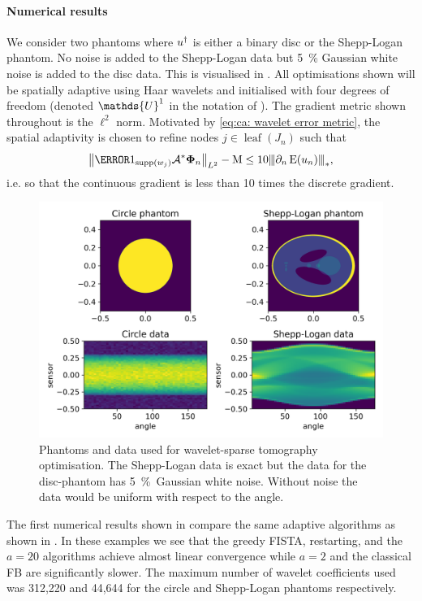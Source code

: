 \documentclass[10pt,a4paper,onecolumn]{article} \usepackage[latin1]{inputenc}
\numberwithin{equation}{section}
\let\F\mathds\let\C\mathcal\newcommand{\R}{\F{R}}\newcommand{\A}{\C{A}}
\newcommand{\Norm}[1]{{\left\vert\kern-0.25ex\left\vert\kern-0.25ex\left\vert #1 \right\vert\kern-0.25ex\right\vert\kern-0.25ex\right\vert}}
\newcommand{\norm}[1]{{\left\lVert #1 \right\rVert}}
\newcommand{\op}[1]{\operatorname{#1}}\newcommand{\overtext}[2]{\stackrel{\text{#1}}{#2}}
\renewcommand{\vec}{\mathbf}
\newcommand*{\Func}[1]{%
	\IfEqCase{#1}{%
		{0}{\op{E}}%
		{1}{\op{F}}%
		{2}{\op{G}}%
		{3}{\op{H}}%
	}[\op{F}#1]%
}
\newcommand*{\varf}[1]{%
	\IfEqCase{#1}{%
		{0}{u}%
		{1}{v}%
		{2}{w}%
	}[u#1]%
}
\newcommand*{\spcf}[1]{%
	\IfEqCase{#1}{%
		{0}{\F{U}}%
		{1}{\F{V}}%
		{2}{\F{W}}%
	}[\F{U}#1]%
}
\newcommand*{\vard}[1]{%
	\IfEqCase{#1}{%
		{0}{\varphi}%
		{1}{\psi}%
	}[\varphi #1]%
}
\newcommand*{\data}[1]{%
	\IfEqCase{#1}{%
		{0}{\eta}%
		{1}{\nu}%
	}[g]%
}
\newcommand*{\vvard}[1]{\vec{\vard{#1}}}\newcommand*{\vdata}[1]{\vec{\data{#1}}}
\begin{document}
\paragraph{Numerical results}
We consider two phantoms where $\varf0^\dagger$ is either a binary disc or the Shepp-Logan phantom. No noise is added to the Shepp-Logan data but \SI{5}{\percent} Gaussian white noise is added to the disc data. This is visualised in . All optimisations shown will be spatially adaptive using Haar wavelets and initialised with four degrees of freedom (denoted $\spcf0^1$ in the notation of ). The gradient metric shown throughout is the $\ell^2$ norm. Motivated by \eqref{eq:ca: wavelet error metric}, the spatial adaptivity is chosen to refine nodes $j\in\op{leaf}(J_n)$ such that 
$$ \norm{\1_{\supp(w_j)}\A^*\vvard0_n}_{L^2} -\mu  \leq 10\Norm{\partial_n\Func0(\varf0_n)}_*,$$
i.e. so that the continuous gradient is less than 10 times the discrete gradient.

\begin{figure}[H]\centering
	\includegraphics[width=.84\textwidth]{haar_data}
	\caption{Phantoms and data used for wavelet-sparse tomography optimisation. The Shepp-Logan data is exact but the data for the disc-phantom has \SI{5}{\percent}\ Gaussian white noise. Without noise the data would be uniform with respect to the angle.}\label{fig:ca: haar data}
\end{figure}

The first numerical results shown in  compare the same adaptive algorithms as shown in . In these examples we see that the greedy FISTA, restarting, and the $a=20$ algorithms achieve almost linear convergence while $a=2$ and the classical FB are significantly slower. The maximum number of wavelet coefficients used was 312,220 and 44,644 for the circle and Shepp-Logan phantoms respectively.
\end{document}
